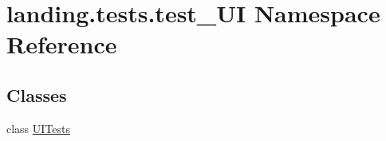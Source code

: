 \hypertarget{namespacelanding_1_1tests_1_1test__UI}{}\section{landing.\+tests.\+test\+\_\+\+UI Namespace Reference}
\label{namespacelanding_1_1tests_1_1test__UI}
\subsection*{Classes}
\begin{DoxyCompactItemize}
\item 
class \mbox{\hyperlink{classlanding_1_1tests_1_1test__UI_1_1UITests}{U\+I\+Tests}}
\end{DoxyCompactItemize}
